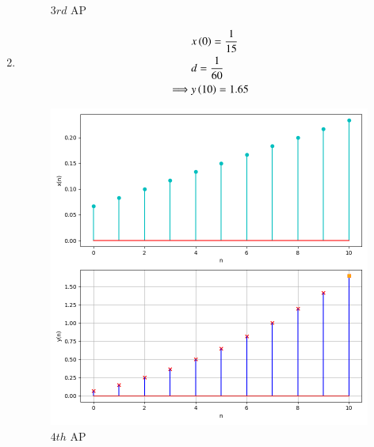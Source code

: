 \documentclass[journal,12pt,twocolumn]{IEEEtran}
\theoremstyle{remark}
\begin{document}
\begin{enumerate}[label=(\alph*)]
\begin{figure}[h!]
        \caption{$3rd$ AP}
    \end{figure}
    \item \begin{align}
        &x\left(0\right)=\frac{1}{15} \\
        &d=\frac{1}{60} \\
        \implies &y\left(10\right)=1.65
    \end{align}
    \begin{figure}[h!]
        \centering
        \includegraphics[width=\columnwidth]{figs/plt4.png}
        \caption{$4th$ AP}
    \end{figure}
\end{enumerate}
\end{document}
